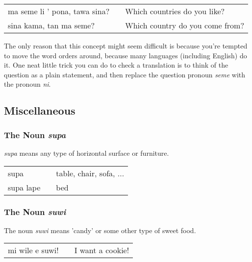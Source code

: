 \begin{supertabular}{p{5,5cm}|ll}
    ma seme li ' pona, tawa sina? &  & Which countries do you like?    \\
    sina kama, tan ma seme?       &  & Which country do you come from? \\
\end{supertabular}

The only reason that this concept might seem difficult is because you're tempted to move the word orders around, because many languages (including English) do it.
One neat little trick you can do to check a translation is to think of the question as a plain statement, and then replace the question pronoun \textit{seme} with the pronoun \textit{ni}.

%
%
%
%
\newpage
\subsection*{Miscellaneous}
%
\subsubsection*{The Noun \textit{supa}}
%
%
\textit{supa} means any type of horizontal surface or furniture.

\begin{supertabular}{p{5,5cm}|ll}
    supa      &  & table, chair, sofa, ... \\
    supa lape &  & bed                     \\
\end{supertabular}

%
\subsubsection*{The Noun \textit{suwi}}
%

The noun \textit{suwi} means  'candy' or some other type of sweet food.

\begin{supertabular}{p{5,5cm}|ll}
    mi wile e suwi! &  & I want a cookie! \\
\end{supertabular}

